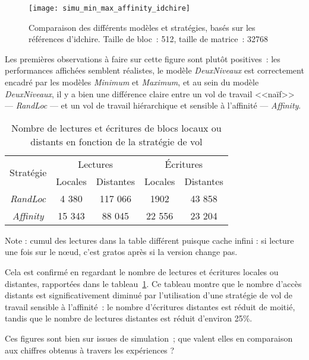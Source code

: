 \begin{figure}[h!]
  \centering
  \texttt{[image: simu\_min\_max\_affinity\_idchire]}
  \caption{Comparaison des différents modèles et stratégies, basés sur les références d'idchire. Taille de bloc~: 512, taille de matrice~: 32768}\label{fig:simu:modeles:idchire}
\end{figure}


Les premières observations à faire sur cette figure sont plutôt positives~: les performances affichées semblent réalistes, le modèle \emph{DeuxNiveaux} est correctement encadré par les modèles \emph{Minimum} et \emph{Maximum}, et au sein du modèle \emph{DeuxNiveaux}, il y a bien une différence claire entre un vol de travail <<naïf>> --- \emph{RandLoc} --- et un vol de travail hiérarchique et sensible à l'affinité --- \emph{Affinity}.

\begin{table}[h!]
\def\arraystretch{1.5}
\centering
\begin{tabular}{|c||c|c|c|c|}\hline
  \multirow{2}{*}{Stratégie} & \multicolumn{2}{c|}{Lectures} & \multicolumn{2}{c|}{Écritures} \\ \cline{2-5}
    & Locales & Distantes & Locales & Distantes \\
  \hline
  \emph{RandLoc} & 4 380 & 117 066 & 1902 & 43 858 \\
  \hline
  \emph{Affinity} & 15 343 & 88 045 & 22 556 & 23 204 \\
  \hline
\end{tabular}
\caption{Nombre de lectures et écritures de blocs locaux ou distants en fonction de la stratégie de vol}\label{tab:simu:acces-blocs-idchire}
\end{table}
\begin{todo}
Note : cumul des lectures dans la table différent puisque cache infini : si lecture une fois sur le nœud, c'est gratos après si la version change pas.
\end{todo}

Cela est confirmé en regardant le nombre de lectures et écritures locales ou distantes, rapportées dans le tableau~\ref{tab:simu:acces-blocs-idchire}.
Ce tableau montre que le nombre d'accès distants est significativement diminué par l'utilisation d'une stratégie de vol de travail sensible à l'affinité~: le nombre d'écritures distantes est réduit de moitié, tandis que le nombre de lectures distantes est réduit d'environ 25\%.


Ces figures sont bien sur issues de simulation~; que valent elles en comparaison aux chiffres obtenus à travers les expériences ?


